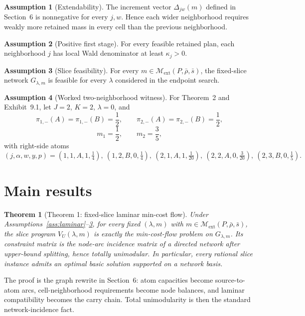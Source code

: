 \documentclass[11pt]{article}
\newcommand{\calM}{\mathcal{M}}
\theoremstyle{definition}
\newtheorem{assumption}{Assumption}
\theoremstyle{plain}
\newtheorem{theorem}{Theorem}
\theoremstyle{remark}
\begin{document}
\begin{assumption}[Extendability]\label{ass:extendability}
The increment vector \(\Delta_{jw}(m)\) defined in Section~6 is nonnegative for every
\(j,w\). Hence each wider neighborhood requires weakly more retained mass in every cell
than the previous neighborhood.
\end{assumption}

\begin{assumption}[Positive first stage]\label{ass:first-stage}
For every feasible retained plan, each neighborhood \(j\) has local Wald denominator at
least \(\kappa_j>0\).
\end{assumption}

\begin{assumption}[Slice feasibility]\label{ass:slice-feasible}
For every \(m\in\calM_{\mathrm{ext}}(P,\bar\rho,\bar s)\), the fixed-slice network
\(G_{\lambda,m}\) is feasible for every \(\lambda\) considered in the endpoint search.
\end{assumption}

\begin{assumption}[Worked two-neighborhood witness]\label{ass:witness}
For Theorem~2 and Exhibit~9.1, let \(J=2\), \(K=2\), \(\lambda=0\), and
\[
\pi_{1,-}(A)=\pi_{1,-}(B)=\frac12,\qquad
\pi_{2,-}(A)=\pi_{2,-}(B)=\frac12,
\]
\[
m_1=\frac12,\qquad m_2=\frac35,
\]
with right-side atoms
\[
(j,\alpha,w,y,p)=
(1,1,A,1,\tfrac14),\ (1,2,B,0,\tfrac14),\
(2,1,A,1,\tfrac1{20}),\ (2,2,A,0,\tfrac3{20}),\ (2,3,B,0,\tfrac15).
\]
\end{assumption}

\section{Main results}
\begin{theorem}[Theorem 1: fixed-slice laminar min-cost flow]\label{thm:slice-flow}
Under Assumptions~\ref{ass:laminar}--\ref{ass:slice-feasible}, for every fixed
\((\lambda,m)\) with \(m\in\calM_{\mathrm{ext}}(P,\bar\rho,\bar s)\), the slice program
\(V_U(\lambda,m)\) is exactly the min-cost-flow problem on \(G_{\lambda,m}\). Its
constraint matrix is the node-arc incidence matrix of a directed network after upper-bound
splitting, hence totally unimodular. In particular, every rational slice instance admits an
optimal basic solution supported on a network basis.
\end{theorem}

The proof is the graph rewrite in Section~6: atom capacities become source-to-atom arcs,
cell-neighborhood requirements become node balances, and laminar compatibility becomes the
carry chain. Total unimodularity is then the standard network-incidence fact.
\end{document}
